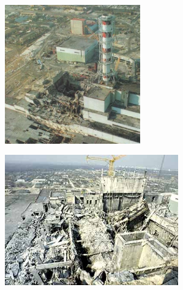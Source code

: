 \documentclass{beamer}
\begin{document}
\begin{frame}{}
    \begin{center}
        \includegraphics[height=6.0cm]{img/allgemein3}\\
        \begin{block}{}
        \end{block}
    \end{center}
\end{frame}

\begin{frame}{}
    \begin{center}
        \includegraphics[width=7.5cm]{img/allgemein4}\\
        \begin{block}{}
        \end{block}
    \end{center}
\end{frame}
\end{document}
